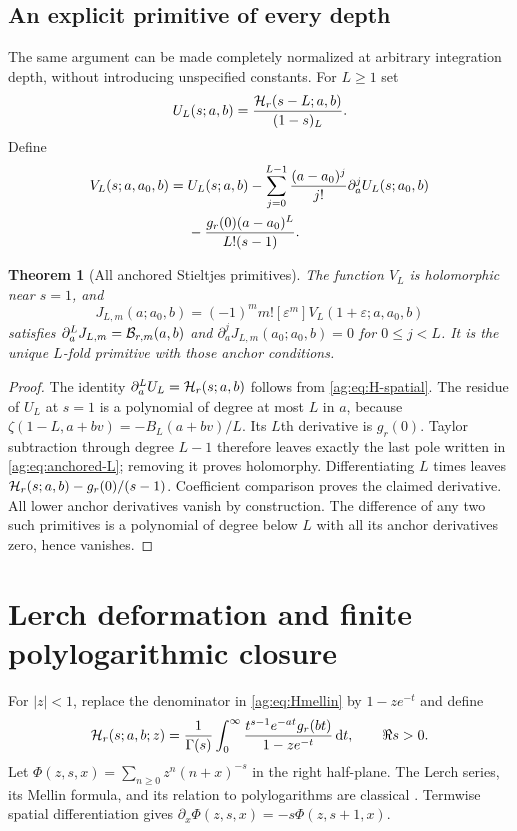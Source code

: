 \documentclass[11pt,letterpaper]{article}
\numberwithin{equation}{section}
\newtheorem{theorem}{Theorem}[section]
\theoremstyle{definition}\newtheorem{definition}[theorem]{Definition}
\theoremstyle{remark}\newtheorem{remark}[theorem]{Remark}
\newcommand{\dd}{\,\mathrm d}\newcommand{\ii}{\mathrm i}
\begin{document}
\subsection{An explicit primitive of every depth}
The same argument can be made completely normalized at arbitrary
integration depth, without introducing unspecified constants.
For $L\ge1$ set
\[
 U_L(s;a,b)=\frac{\mathcal H_r(s-L;a,b)}{(1-s)_L}.
\]
Define
\begin{align}
 V_L(s;a,a_0,b)={}&U_L(s;a,b)
 -\sum_{j=0}^{L-1}\frac{(a-a_0)^j}{j!}\partial_a^jU_L(s;a_0,b)\notag\\
 &-\frac{g_r(0)(a-a_0)^L}{L!(s-1)}.
 \label{ag:eq:anchored-L}
\end{align}
\begin{theorem}[All anchored Stieltjes primitives]\label{ag:thm:all-primitives}
The function $V_L$ is holomorphic near $s=1$, and
\begin{equation}\label{ag:eq:all-primitives}
 J_{L,m}(a;a_0,b)=(-1)^m m![\varepsilon^m]
                          V_L(1+\varepsilon;a,a_0,b)
\end{equation}
satisfies
$\partial_a^LJ_{L,m}=\mathcal B_{r,m}(a,b)$ and
$\partial_a^jJ_{L,m}(a_0;a_0,b)=0$ for $0\le j<L$.
It is the unique $L$-fold primitive with those anchor conditions.
\end{theorem}
\begin{proof}
The identity $\partial_a^LU_L=\mathcal H_r(s;a,b)$ follows from
\eqref{ag:eq:H-spatial}. The residue of $U_L$ at $s=1$ is a polynomial
of degree at most $L$ in $a$, because
$\zeta(1-L,a+bv)=-B_L(a+bv)/L$. Its $L$th derivative is $g_r(0)$.
Taylor subtraction through degree $L-1$ therefore leaves exactly the
last pole written in \eqref{ag:eq:anchored-L}; removing it proves
holomorphy. Differentiating $L$ times leaves
$\mathcal H_r(s;a,b)-g_r(0)/(s-1)$. Coefficient comparison proves the
claimed derivative. All lower anchor derivatives vanish by construction.
The difference of any two such primitives is a polynomial of degree
below $L$ with all its anchor derivatives zero, hence vanishes.
\end{proof}



\section{Lerch deformation and finite polylogarithmic closure}
\label{ag:sec:polylogs}

For $|z|<1$, replace the denominator in \eqref{ag:eq:Hmellin} by
$1-ze^{-t}$ and define
\begin{equation}\label{ag:eq:Lerch-transform}
 \HH_r(s;a,b;z)=\frac1{\Gamma(s)}\int_0^\infty
             \frac{t^{s-1}e^{-at}g_r(bt)}{1-ze^{-t}}\dd t,
                     \qquad\Re s>0.
\end{equation}
Let $\Phi(z,s,x)=\sum_{n\ge0}z^n(n+x)^{-s}$ in the right half-plane.
The Lerch series, its Mellin formula, and its relation to polylogarithms
are classical \cite{DLMFlerch}. Termwise spatial differentiation gives
$\partial_x\Phi(z,s,x)=-s\Phi(z,s+1,x)$.
\end{document}
